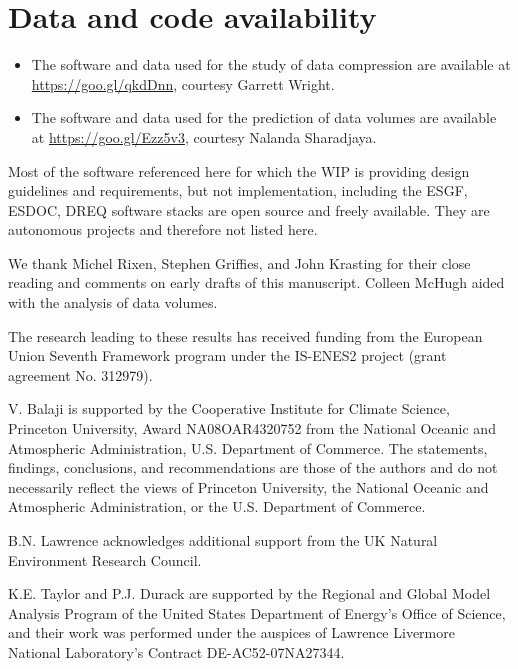 \documentclass[gmd,manuscript]{copernicus}
\begin{document}
\section{Data and code availability}
\label{sec:code}

\begin{itemize}
\item The software and data used for the study of data compression are
  available at \url{https://goo.gl/qkdDnn}, courtesy Garrett Wright.
\item The software and data used for the prediction of data volumes
  are available at \url{https://goo.gl/Ezz5v3}, courtesy Nalanda
  Sharadjaya.
\end{itemize}

Most of the software referenced here for which the WIP is providing
design guidelines and requirements, but not implementation, including
the ESGF, ESDOC, DREQ software stacks are open source and freely
available. They are autonomous projects and therefore not listed here.

\begin{acknowledgements}
  We thank Michel Rixen, Stephen Griffies, and John Krasting for their
  close reading and comments on early drafts of this manuscript.
  Colleen McHugh aided with the analysis of data volumes.
  
  The research leading to these results has received funding from the
  European Union Seventh Framework program under the IS-ENES2 project
  (grant agreement No. 312979).

  V. Balaji is supported by the Cooperative Institute for Climate
  Science, Princeton University, Award NA08OAR4320752 from the
  National Oceanic and Atmospheric Administration, U.S. Department of
  Commerce. The statements, findings, conclusions, and recommendations
  are those of the authors and do not necessarily reflect the views of
  Princeton University, the National Oceanic and Atmospheric
  Administration, or the U.S. Department of Commerce.

  B.N. Lawrence acknowledges additional support from the UK Natural
  Environment Research Council.
  
  K.E. Taylor and P.J. Durack are supported by the Regional and Global
  Model Analysis Program of the United States Department of Energy's
  Office of Science, and their work was performed under the auspices
  of Lawrence Livermore National Laboratory's Contract
  DE-AC52-07NA27344.
\end{acknowledgements}



\end{document}
